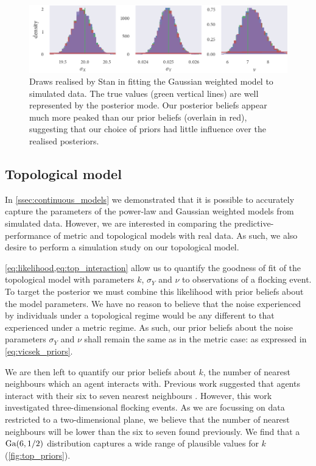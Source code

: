 \begin{figure}[tbp]
  \includegraphics{gauss_hist.pdf}
  \caption{Draws realised by Stan in fitting the Gaussian weighted model to
    simulated data. The true values (green vertical lines) are well
    represented by the posterior mode. Our posterior beliefs appear much more
    peaked than our prior beliefs (overlain in red), suggesting that our
    choice of priors had little influence over the realised posteriors.}
  \label{fig:gauss_hist}
\end{figure}

\subsection{Topological model}

In \cref{ssec:continuous_models} we demonstrated that it is possible to
accurately capture the parameters of the power-law and Gaussian weighted models
from simulated data. However, we are interested in comparing the
predictive-performance of metric and topological models with real data. As
such, we also desire to perform a simulation study on our topological model.

\cref{eq:likelihood,eq:top_interaction} allow us to quantify the goodness of
fit of the topological model with parameters $k$, $\sigma_Y$ and $\nu$ to
observations of a flocking event. To target the posterior we must combine this
likelihood with prior beliefs about the model parameters. We have no reason to
believe that the noise experienced by individuals under a topological regime
would be any different to that experienced under a metric regime. As such, our
prior beliefs about the noise parameters $\sigma_Y$ and $\nu$ shall remain the
same as in the metric case: as expressed in \cref{eq:vicsek_priors}.

We are then left to quantify our prior beliefs about $k$, the number of nearest
neighbours which an agent interacts with. Previous work suggested that agents
interact with their six to seven nearest neighbours \parencite{ballerini08}.
However, this work investigated three-dimensional flocking events. As we are
focussing on data restricted to a two-dimensional plane, we believe that the
number of nearest neighbours will be lower than the six to seven found
previously. We find that a $\textrm{Ga}(6, 1/2)$ distribution captures a wide range of
plausible values for $k$ (\cref{fig:top_priors}).

